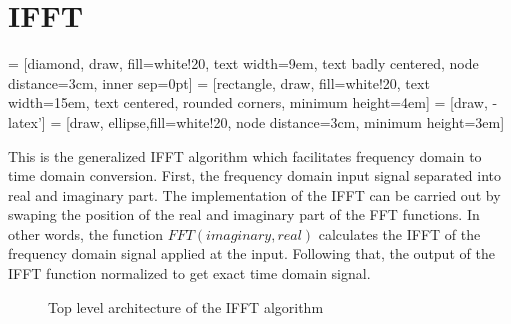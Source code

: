 %
%
\clearpage
\section{IFFT}

 = [diamond, draw, fill=white!20, 
text width=9em, text badly centered, node distance=3cm, inner sep=0pt]
 = [rectangle, draw, fill=white!20, 
text width=15em, text centered, rounded corners, minimum height=4em]
 = [draw, -latex']
 = [draw, ellipse,fill=white!20, node distance=3cm,
minimum height=3em]


This is the generalized IFFT algorithm which facilitates frequency domain to time domain conversion. First, the frequency domain input signal separated into real and imaginary part. The implementation of the IFFT can be carried out by swaping the position of the real and imaginary part of the FFT functions. In other words, the function $FFT(imaginary,real)$ calculates the IFFT of the frequency domain signal applied at the input. Following that, the output of the IFFT function normalized to get exact time domain signal.

\begin{center}
\begin{figure}[ht]

\begin{center}
\end{center}
\vspace{0.5cm}
\caption{Top level architecture of the IFFT algorithm}
\label{Top_level_FFT }
\end{figure}
\end{center}

